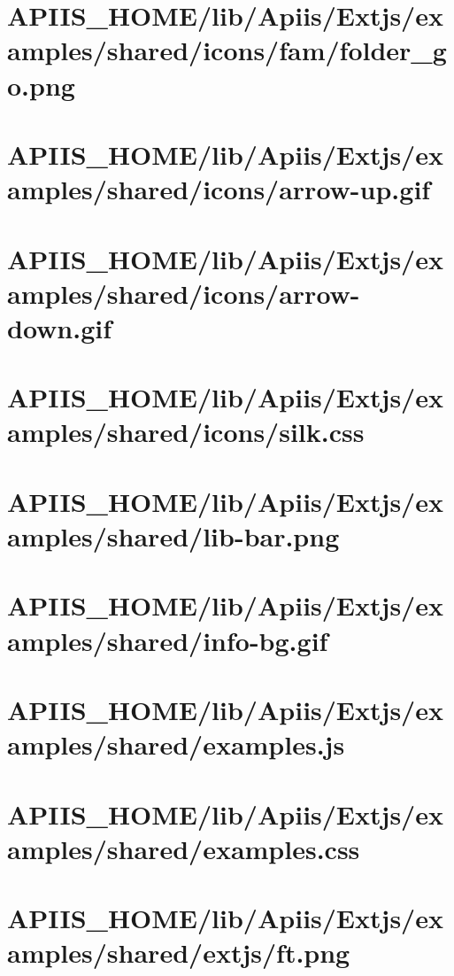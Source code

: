 \section{APIIS\_HOME/lib/Apiis/Extjs/examples/shared/icons/fam/folder\_go.png} 
\section{APIIS\_HOME/lib/Apiis/Extjs/examples/shared/icons/arrow-up.gif} 
\section{APIIS\_HOME/lib/Apiis/Extjs/examples/shared/icons/arrow-down.gif} 
\section{APIIS\_HOME/lib/Apiis/Extjs/examples/shared/icons/silk.css} 
\section{APIIS\_HOME/lib/Apiis/Extjs/examples/shared/lib-bar.png} 
\section{APIIS\_HOME/lib/Apiis/Extjs/examples/shared/info-bg.gif} 
\section{APIIS\_HOME/lib/Apiis/Extjs/examples/shared/examples.js} 
\section{APIIS\_HOME/lib/Apiis/Extjs/examples/shared/examples.css} 
\section{APIIS\_HOME/lib/Apiis/Extjs/examples/shared/extjs/ft.png} 
